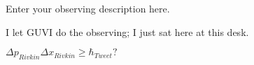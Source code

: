%
%
\describeobservations   %

Enter your observing description here.

I let GUVI do the observing; I just sat here at this desk.

$\Delta p_{Rivkin} \Delta x_{Rivkin} \ge \hbar_{Tweet} ?$